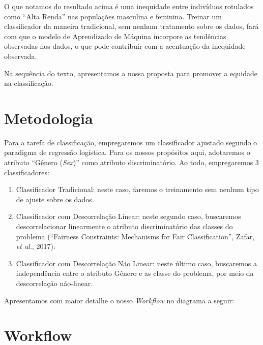 \documentclass[11pt]{article}
\begin{document}
    O que notamos do resultado acima é uma inequidade entre indivíduos
rotulados como ``Alta Renda'' nas populações masculina e feminina.
Treinar um classificador da maneira tradicional, sem nenhum tratamento
sobre os dados, fará com que o modelo de Aprendizado de Máquina
incorpore as tendências observadas nos dados, o que pode contribuir com
a acentuação da inequidade observada.

Na sequência do texto, apresentamos a nossa proposta para promover a
equidade na classificação.

    \hypertarget{metodologia}{%
\section{Metodologia}\label{metodologia}}

Para a tarefa de classificação, empregaremos um classificador ajustado
segundo o paradigma de regressão logística. Para os nossos propósitos
aqui, adotaremos o atributo ``Gênero (\emph{Sex})'' como atributo
discriminatório. Ao todo, empregaremos 3 classificadores:

\begin{enumerate}
\def\labelenumi{\arabic{enumi})}
\item
  Classificador Tradicional: neste caso, faremos o treinamento sem
  nenhum tipo de ajuste sobre os dados.
\item
  Classificador com Descorrelação Linear: neste segundo caso, buscaremos
  descorrelacionar linearmente o atributo discriminatório das classes do
  problema (``Fairness Constraints: Mechanisms for Fair
  Classification'', Zafar, \emph{et al.}, 2017).
\item
  Classificador com Descorrelação Não Linear: neste último caso,
  buscaremos a independência entre o atributo Gênero e as classe do
  problema, por meio da descorrelação não-linear.
\end{enumerate}

Apresentamos com maior detalhe o nosso \emph{Workflow} no diagrama a
seguir:

    \hypertarget{workflow}{%
\section{Workflow}\label{workflow}}
\end{document}
